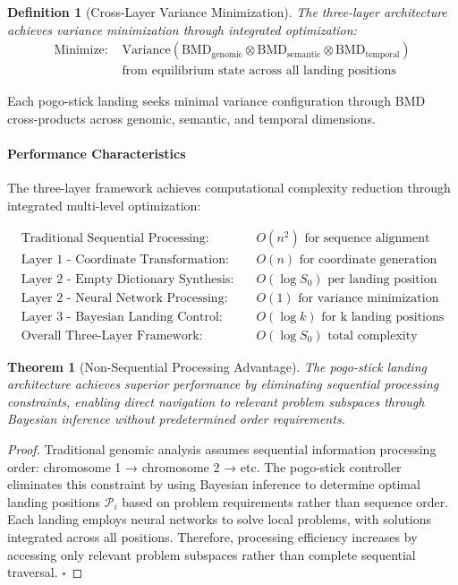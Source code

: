 \documentclass[12pt,a4paper]{article}
\newtheorem{theorem}{Theorem}
\newtheorem{definition}{Definition}
\begin{document}
\begin{definition}[Cross-Layer Variance Minimization]
The three-layer architecture achieves variance minimization through integrated optimization:
\begin{align}
\text{Minimize: } &\text{Variance}(\text{BMD}_{\text{genomic}} \otimes \text{BMD}_{\text{semantic}} \otimes \text{BMD}_{\text{temporal}}) \\
&\text{from equilibrium state across all landing positions}
\end{align}
\end{definition}

Each pogo-stick landing seeks minimal variance configuration through BMD cross-products across genomic, semantic, and temporal dimensions.

\paragraph{Performance Characteristics}

The three-layer framework achieves computational complexity reduction through integrated multi-level optimization:

\begin{align}
\text{Traditional Sequential Processing:} \quad &O(n^2) \text{ for sequence alignment} \\
\text{Layer 1 - Coordinate Transformation:} \quad &O(n) \text{ for coordinate generation} \\
\text{Layer 2 - Empty Dictionary Synthesis:} \quad &O(\log S_0) \text{ per landing position} \\
\text{Layer 2 - Neural Network Processing:} \quad &O(1) \text{ for variance minimization} \\
\text{Layer 3 - Bayesian Landing Control:} \quad &O(\log k) \text{ for k landing positions} \\
\text{Overall Three-Layer Framework:} \quad &O(\log S_0) \text{ total complexity}
\end{align}

\begin{theorem}[Non-Sequential Processing Advantage]
The pogo-stick landing architecture achieves superior performance by eliminating sequential processing constraints, enabling direct navigation to relevant problem subspaces through Bayesian inference without predetermined order requirements.
\end{theorem}

\begin{proof}
Traditional genomic analysis assumes sequential information processing order: chromosome 1 → chromosome 2 → etc. The pogo-stick controller eliminates this constraint by using Bayesian inference to determine optimal landing positions $\mathcal{P}_i$ based on problem requirements rather than sequence order. Each landing employs neural networks to solve local problems, with solutions integrated across all positions. Therefore, processing efficiency increases by accessing only relevant problem subspaces rather than complete sequential traversal. $\square$
\end{proof}
\end{document}
